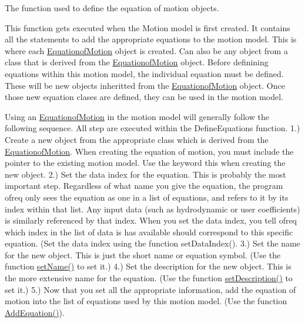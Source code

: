The function used to define the equation of motion objects. 

This function gets executed when the Motion model is first created. It contains all the statements to add the appropriate equations to the motion model. This is where each \hyperlink{classosea_1_1ofreq_1_1_equationof_motion}{Equationof\-Motion} object is created. Can also be any object from a class that is derived from the \hyperlink{classosea_1_1ofreq_1_1_equationof_motion}{Equationof\-Motion} object. Before definining equations within this motion model, the individual equation must be defined. These will be new objects inheritted from the \hyperlink{classosea_1_1ofreq_1_1_equationof_motion}{Equationof\-Motion} object. Once those new equation clases are defined, they can be used in the motion model.

Using an \hyperlink{classosea_1_1ofreq_1_1_equationof_motion}{Equationof\-Motion} in the motion model will generally follow the following sequence. All step are executed within the Define\-Equations function. 1.) Create a new object from the appropriate class which is derived from the \hyperlink{classosea_1_1ofreq_1_1_equationof_motion}{Equationof\-Motion}. When creating the equation of motion, you must include the pointer to the existing motion model. Use the keyword this when creating the new object. 2.) Set the data index for the equation. This is probably the most important step. Regardless of what name you give the equation, the program ofreq only sees the equation as one in a list of equations, and refers to it by its index within that list. Any input data (such as hydrodynamic or user coefficients) is similarly referenced by that index. When you set the data index, you tell ofreq which index in the list of data is has available should correspond to this specific equation. (Set the data index using the function set\-Data\-Index(). 3.) Set the name for the new object. This is just the short name or equation symbol. (Use the function \hyperlink{classosea_1_1ofreq_1_1_motion_model_a42d989727028c18c59ba04f958bc7b74}{set\-Name()} to set it.) 4.) Set the description for the new object. This is the more extensive name for the equation. (Use the function \hyperlink{classosea_1_1ofreq_1_1_motion_model_a5097540bb98ad753594d41890e6ef30d}{set\-Description()} to set it.) 5.) Now that you set all the appropriate information, add the equation of motion into the list of equations used by this motion model. (Use the function \hyperlink{classosea_1_1ofreq_1_1_motion_model_a73489d88c07b26109bbb9bdd0a576b30}{Add\-Equation()}).

